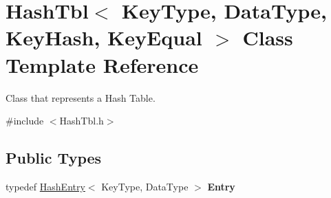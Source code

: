 \hypertarget{classHashTbl}{}\section{Hash\+Tbl$<$ Key\+Type, Data\+Type, Key\+Hash, Key\+Equal $>$ Class Template Reference}
\label{classHashTbl}


Class that represents a Hash Table.  




{\ttfamily \#include $<$Hash\+Tbl.\+h$>$}

\subsection*{Public Types}
\begin{DoxyCompactItemize}
\item 
typedef \hyperlink{classHashEntry}{Hash\+Entry}$<$ Key\+Type, Data\+Type $>$ {\bfseries Entry}\hypertarget{classHashTbl_af0d04a9ca350def9cb51b573d4dce7d5}{}\label{classHashTbl_af0d04a9ca350def9cb51b573d4dce7d5}

\end{DoxyCompactItemize}
